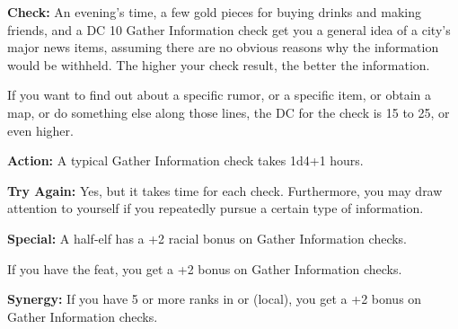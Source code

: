\textbf{Check:} An evening's time, a few gold pieces for buying drinks and making friends, and a DC 10 Gather Information check get you a general idea of a city's major news items, assuming there are no obvious reasons why the information would be withheld. The higher your check result, the better the information.

If you want to find out about a specific rumor, or a specific item, or obtain a map, or do something else along those lines, the DC for the check is 15 to 25, or even higher.

\textbf{Action:} A typical Gather Information check takes 1d4+1 hours.

\textbf{Try Again:} Yes, but it takes time for each check. Furthermore, you may draw attention to yourself if you repeatedly pursue a certain type of information.

\textbf{Special:} A half-elf has a +2 racial bonus on Gather Information checks.

If you have the  feat, you get a +2 bonus on Gather Information checks.

\textbf{Synergy:} If you have 5 or more ranks in  or  (local), you get a +2 bonus on Gather Information checks.
